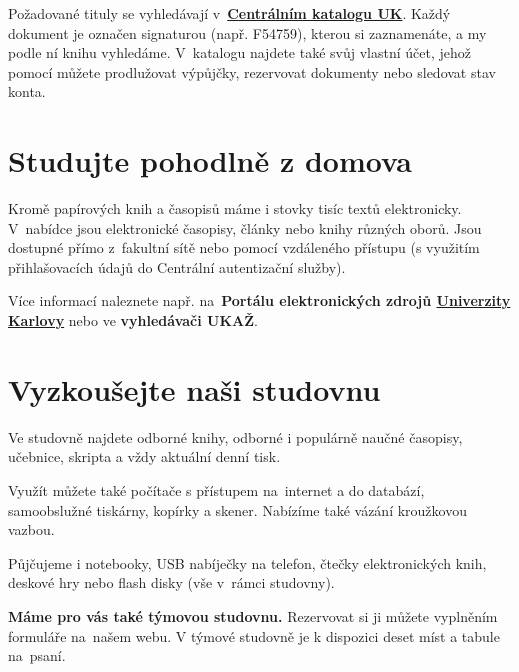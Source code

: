 Požadované tituly se vyhledávají v~\href{http://ckis.cuni.cz/}{\textbf{Centrálním katalogu UK}}. Každý
dokument je označen signaturou (např. F54759), kterou si zaznamenáte,
a my podle ní knihu vyhledáme. V~katalogu najdete také svůj vlastní
účet, jehož pomocí můžete prodlužovat výpůjčky, rezervovat dokumenty nebo
sledovat stav konta.

\ikonka{\faBed}
\section{Studujte pohodlně z domova}
Kromě papírových knih a časopisů máme i
stovky tisíc textů elektronicky.  V~nabídce jsou elektronické
časopisy, články nebo knihy různých oborů. Jsou dostupné přímo
z~fakultní sítě nebo pomocí vzdáleného přístupu (s využitím
přihlašovacích údajů do Centrální autentizační služby).

Více informací naleznete např. na~\textbf{Portálu elektronických zdrojů
  {\href{https://ezdroje.cuni.cz}{Univerzity Karlovy}}} nebo ve \textbf{vyhledávači UKAŽ}.




\ikonka{\faGraduationCap}
\section{Vyzkoušejte naši studovnu}

Ve studovně najdete odborné knihy, odborné i populárně naučné
časopisy, učebnice, skripta a vždy aktuální denní tisk.

Využít můžete také počítače s přístupem na~internet a do databází,
samoobslužné tiskárny, kopírky a skener. Nabízíme také vázání kroužkovou vazbou.

Půjčujeme i notebooky, USB nabíječky na
telefon, čtečky elektronických knih, deskové hry nebo flash disky (vše
v~rámci studovny).

\textbf{Máme pro vás také týmovou studovnu.} Rezervovat si ji můžete
vyplněním formuláře na~našem webu. V týmové studovně je k dispozici deset míst
a tabule na~psaní.



